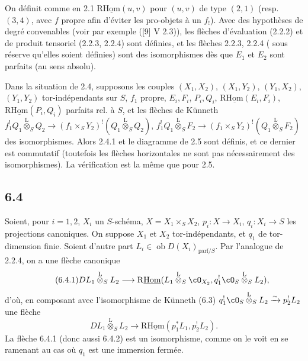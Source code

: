 On définit comme en 2.1 $\mathrm{R}\underline{\mathrm{Hom}}(u,v)$ pour $(u,v)$ de type $(2,1)$ (resp. $(3,4)$, avec $f$ propre afin d'éviter les pro-objets  à un $f_!$). Avec des hypothèses de degré convenables (voir par exemple ([9] V 2.3)), les flèches d'évaluation (2.2.2) et de produit tensoriel (2.2.3, 2.2.4) sont définies, et les flèches 
2.2.3, 2.2.4 (
sous réserve qu'elles soient définies) sont des isomorphismes dès que $E_1$ et $E_2$ sont parfaits (au sens absolu).

Dans la situation de 2.4, supposons les couples $(X_1,X_2)$, $(X_1,Y_2)$, $(Y_1,X_2)$, $(Y_1,Y_2)$ tor-indépendants sur $S$, $f_1$ propre, $E_i,F_i$, $P_i,Q_i$, $\mathrm{R}\underline{\mathrm{Hom}}(E_i,F_i)$, $\mathrm{R}\underline{\mathrm{Hom}}(P_i,Q_i)$ parfaits rel. à $S$, et les flèches de Künneth $f_1^!Q_1\overset{\mathrm{L}}{\otimes}_SQ_2\to(f_1\times_SY_2)^!(Q_1\overset{\mathrm{L}}{\otimes}_SQ_2)$, $f_1^!Q_1\overset{\mathrm{L}}{\otimes}_SF_2\to(f_1\times_SY_2)^!(Q_1\overset{\mathrm{L}}{\otimes}_SF_2)$ des isomorphismes. Alors 2.4.1 et le diagramme de 2.5 sont définis, et ce dernier est commutatif (toutefois les flèches horizontales ne sont pas nécessairement des isomorphismes). La vérification est la même que pour 2.5.

\subsection*{6.4}
Soient, pour $i=1,2$, $X_i$ un $S$-schéma, $X=X_1\times_SX_2$, $p_i:X\to X_i$, $q_i:X_i\to S$ les projections canoniques. On suppose $X_1$ et $X_2$ tor-indépendants, et $q_1$ de tor-dimension finie. Soient d'autre part $L_i\in\operatorname{ob}D(X_i)_{\mathrm{parf}/S}$. Par l'analogue de 2.2.4, on a une flèche canonique
\begin{equation}
\tag{6.4.1}
DL_1\overset{\mathrm{L}}{\otimes}_SL_2\longrightarrow \mathrm{R}\underline{\mathrm{Hom}}(L_1\overset{\mathrm{L}}{\otimes}_S\cO_{X_2},q_1^!\cO_S\overset{\mathrm{L}}{\otimes}_SL_2),
\end{equation}
d'où, en composant avec l'isomorphisme de Künneth (6.3) $q_1^!\cO_S\overset{\mathrm{L}}{\otimes}_SL_2\xrightarrow{\sim}p_2^!L_2$ une flèche
\begin{equation}
\tag{6.4.2}
DL_1\overset{\mathrm{L}}{\otimes}_SL_2\longrightarrow\mathrm{R}\underline{\mathrm{Hom}}(p_1^*L_1,p_2^!L_2).
\end{equation}
La flèche 6.4.1 (donc aussi 6.4.2) est un isomorphisme, comme on le voit en se ramenant au cas où $q_1$ est une immersion fermée.

